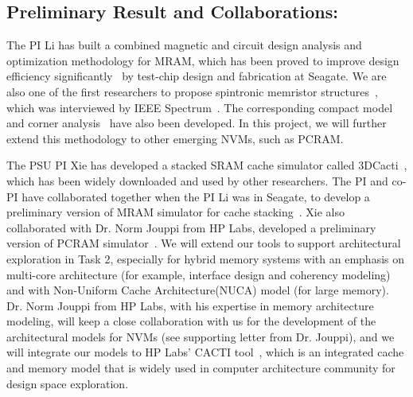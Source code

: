 \subsection{Preliminary Result and Collaborations:}  
The PI Li has built a combined magnetic and circuit design analysis and optimization methodology for MRAM, which has been proved to improve design efficiency significantly~\cite{Chen08} by test-chip design and fabrication at Seagate. We are also one of the first researchers to propose spintronic memristor structures~\cite{Wang09}, which was interviewed by IEEE Spectrum~\cite{Spectrum09}. The corresponding compact model and corner analysis~\cite{Chen09} have also been developed. In this project, we will further extend this methodology to other emerging NVMs, such as PCRAM.

The PSU PI Xie has developed a stacked SRAM cache
simulator called 3DCacti~\cite{xie:iccd05-3d, XIE:TVLSI2008-3DCacti},
which has been widely downloaded and used by other researchers.
The PI and co-PI have collaborated together when the PI Li was in Seagate,
to develop a preliminary version of MRAM simulator for cache stacking~\cite{MRAM:DONG08,XIE:HPCA09}.
Xie also collaborated with Dr. Norm Jouppi
from HP Labs, developed a preliminary version of PCRAM simulator~\cite{xie:pcramsim}.
We will extend our tools to support architectural exploration in Task 2, especially
for hybrid memory systems with an emphasis on multi-core architecture
(for example, interface design and coherency modeling)
and with Non-Uniform Cache Architecture(NUCA) model (for large
memory). Dr. Norm Jouppi from HP Labs,
with his expertise in memory architecture modeling, will keep a close
collaboration with us for the development of the architectural models for NVMs (see supporting letter
from Dr. Jouppi), and we will integrate our models to HP Labs' CACTI tool~\cite{CACTI}, which is an integrated cache and memory model that is widely used in computer architecture community for design space exploration.

